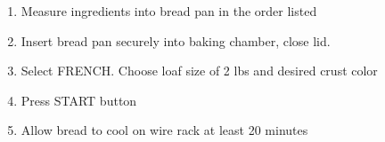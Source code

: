 \documentclass[letter]{recipe}
\begin{document}

\begin{enumerate}
\addtolength{\itemindent}{2em}
 \item Measure ingredients into bread pan in the order listed
 \item Insert bread pan securely into baking chamber, close lid.
 \item Select FRENCH.  Choose loaf size of 2 lbs and desired crust color
 \item Press START button  
 \item Allow bread to cool on wire rack at least 20 minutes
\end{enumerate}
\end{document}
